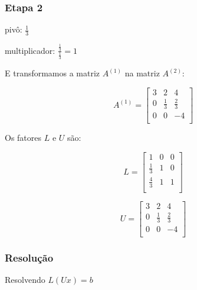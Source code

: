 \documentclass[a4paper]{article}
\begin{document}
\subsubsection*{Etapa 2}

pivô: $\frac{1}{3}$

multiplicador: $\frac{\frac{1}{3}}{\frac{1}{3}} = 1$

E transformamos a matriz $A^{(1)}$ na matriz $A^{(2)}$:

\begin{displaymath}
  A^{(1)} = \begin{bmatrix}
    3 & 2 & 4\\
    0 & \frac{1}{3} & \frac{2}{3}\\
    0 & 0 & -4\\
  \end{bmatrix}
\end{displaymath}

Os fatores $L$ e $U$ são:

\begin{displaymath}
  L = \begin{bmatrix}
    1 & 0 & 0\\
    \frac{1}{3} & 1 & 0\\
    \frac{4}{3} & 1 & 1\\
  \end{bmatrix}
\end{displaymath}

\begin{displaymath}
  U = \begin{bmatrix}
    3 & 2 & 4\\
    0 & \frac{1}{3} & \frac{2}{3}\\
    0 & 0 & -4\\
  \end{bmatrix}
\end{displaymath}


\subsubsection*{Resolução}

Resolvendo $L(Ux)=b$
\end{document}
